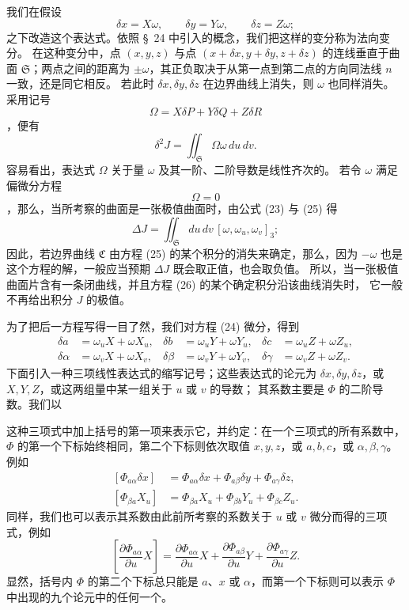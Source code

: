 \documentclass[11pt,a4paper,leqno]{article}
\begin{document}
我们在假设
\begin{equation}\tag{24}
\delta x=X\omega,\qquad \delta y=Y\omega,\qquad \delta z=Z\omega;
\end{equation}
之下改造这个表达式。依照 \S~24 中引入的概念，我们把这样的变分称为法向变分。
在这种变分中，点 $(x,y,z)$ 与点
$(x+\delta x,y+\delta y,z+\delta z)$ 的连线垂直于曲面 $\mathfrak{S}$；两点之间的距离为
$\pm\omega$，其正负取决于从第一点到第二点的方向同法线 $n$ 一致，还是同它相反。
若此时 $\delta x,\delta y,\delta z$ 在边界曲线上消失，则 $\omega$ 也同样消失。采用记号
\[
\Omega=X\delta P+Y\delta Q+Z\delta R
\]
，便有
\begin{equation}\tag{25}
\delta^2J=\iint_{\mathfrak{S}}\Omega\omega\,du\,dv.
\end{equation}
容易看出，表达式 $\Omega$ 关于量 $\omega$ 及其一阶、二阶导数是线性齐次的。
若令 $\omega$ 满足偏微分方程
\begin{equation}\tag{26}
\Omega=0
\end{equation}
，那么，当所考察的曲面是一张极值曲面时，由公式 (23) 与 (25) 得
\[
\Delta J=\iint_{\mathfrak{S}}du\,dv\,[\omega,\omega_u,\omega_v]_3;
\]
因此，若边界曲线 $\mathfrak{C}$ 由方程 (25) 的某个积分的消失来确定，那么，因为
$-\omega$ 也是这个方程的解，一般应当预期 $\Delta J$ 既会取正值，也会取负值。
所以，当一张极值曲面片含有一条闭曲线，并且方程 (26) 的某个确定积分沿该曲线消失时，
它一般不再给出积分 $J$ 的极值。

为了把后一方程写得一目了然，我们对方程 (24) 微分，得到
\[
\begin{aligned}
\delta a&=\omega_uX+\omega X_u,&
\delta b&=\omega_uY+\omega Y_u,&
\delta c&=\omega_uZ+\omega Z_u,\\
\delta\alpha&=\omega_vX+\omega X_v,&
\delta\beta&=\omega_vY+\omega Y_v,&
\delta\gamma&=\omega_vZ+\omega Z_v.
\end{aligned}
\]
下面引入一种三项线性表达式的缩写记号；这些表达式的论元为
$\delta x,\delta y,\delta z$，或 $X,Y,Z$，或这两组量中某一组关于 $u$ 或 $v$ 的导数；
其系数主要是 $\Phi$ 的二阶导数。我们以

这种三项式中加上括号的第一项来表示它，并约定：在一个三项式的所有系数中，
$\Phi$ 的第一个下标始终相同，第二个下标则依次取值 $x,y,z$，或 $a,b,c$，或
$\alpha,\beta,\gamma$。例如
\[
\begin{aligned}
[\Phi_{a\alpha}\delta x]&=\Phi_{a\alpha}\delta x+\Phi_{a\beta}\delta y
+\Phi_{a\gamma}\delta z,\\
[\Phi_{\beta a}X_u]&=\Phi_{\beta a}X_u+\Phi_{\beta b}Y_u
+\Phi_{\beta c}Z_u.
\end{aligned}
\]
同样，我们也可以表示其系数由此前所考察的系数关于 $u$ 或 $v$ 微分而得的三项式，例如
\[
\left[\frac{\partial\Phi_{a\alpha}}{\partial u}X\right]
=\frac{\partial\Phi_{a\alpha}}{\partial u}X
+\frac{\partial\Phi_{a\beta}}{\partial u}Y
+\frac{\partial\Phi_{a\gamma}}{\partial u}Z.
\]
显然，括号内 $\Phi$ 的第二个下标总只能是 $a$、$x$ 或 $\alpha$，而第一个下标则可以表示
$\Phi$ 中出现的九个论元中的任何一个。
\end{document}
